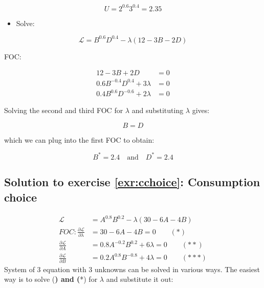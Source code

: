 \documentclass[
  12pt,
  oneside]{book}
\providecommand{\tightlist}{%
  \setlength{\itemsep}{0pt}\setlength{\parskip}{0pt}}
\theoremstyle{definition}
\theoremstyle{definition}
\theoremstyle{definition}
\theoremstyle{definition}
\theoremstyle{remark}
\begin{document}
\[U=2^{0.6}3^{0.4}=2.35\]

\begin{itemize}
\tightlist
\item
  Solve:
\end{itemize}

\[
\mathcal{L}=B^{0.6}D^{0.4}-\lambda(12-3B-2D)
\]

FOC:

\begin{align*}
12-3B+2D&=0\\
0.6B^{-0.4}D^{0.4}+3\lambda&=0\\
0.4B^{0.6}D^{-0.6}+2\lambda&=0
\end{align*}

Solving the second and third FOC for \(\lambda\) and substituting \(\lambda\) gives:

\[B=D\]

which we can plug into the first FOC to obtain:

\[B^*=2.4 \quad \text{and} \quad D^*=2.4\]

\hypertarget{sol:cchoice}{%
\subsection*{Solution to exercise \ref{exr:cchoice}: Consumption choice}\label{sol:cchoice}}

\begin{align*}
\mathcal{L}&=A^{0.8}B^{0.2}-\lambda(30-6A-4B)\\
FOC: \frac{\partial \mathcal{L}}{\partial \lambda}&=30-6A-4B=0 \qquad (*)\\
\frac{\partial \mathcal{L}}{\partial A}&=0.8A^{-0.2}B^{0.2}+6\lambda=0 \qquad (**)\\
\frac{\partial \mathcal{L}}{\partial B}&=0.2A^{0.8}B^{-0.8}+4\lambda=0 \qquad (***)
\end{align*}
System of 3 equation with 3 unknowns can be solved in various ways.
The easiest way is to solve (\textbf{) and (}*) for \(\lambda\) and substitute it out:
\end{document}
